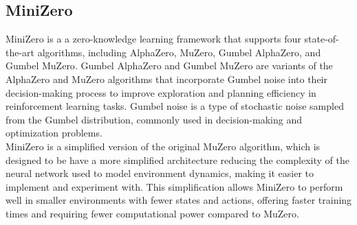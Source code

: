 \subsection*{MiniZero}
MiniZero is a a zero-knowledge learning framework that supports four
state-of-the-art algorithms, including AlphaZero, MuZero, Gumbel AlphaZero, and
Gumbel MuZero\cite{AD1}. Gumbel AlphaZero and Gumbel MuZero are variants of the
AlphaZero and MuZero algorithms that incorporate Gumbel noise into their
decision-making process to improve exploration and planning efficiency in
reinforcement learning tasks. Gumbel noise is a type of stochastic noise
sampled from the Gumbel distribution, commonly used in decision-making and
optimization problems.\\ MiniZero is a simplified version of the original
MuZero algorithm, which is designed to be have a more simplified architecture
reducing the complexity of the neural network used to model environment
dynamics, making it easier to implement and experiment with. This
simplification allows MiniZero to perform well in smaller environments with
fewer states and actions, offering faster training times and requiring fewer
computational power compared to MuZero.

